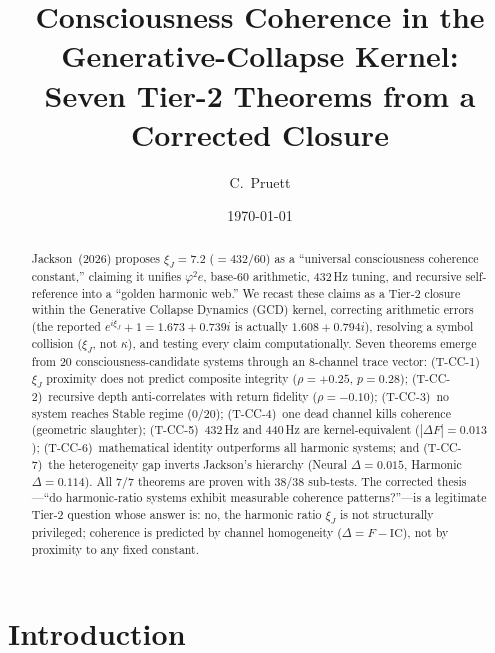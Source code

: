 \documentclass[
  aps,
  prd,
  twocolumn,
  superscriptaddress,
  nofootinbib,
  floatfix
]{revtex4-2}
\newcommand{\IC}{\mathrm{IC}}
\newcommand{\xiJ}{\xi_J}
\begin{document}
\title{Consciousness Coherence in the Generative-Collapse Kernel:\\
Seven Tier-2 Theorems from a Corrected Closure}

\author{C.~Pruett}

\date{\today}

\begin{abstract}
Jackson~(2026) proposes $\xiJ = 7.2$ ($= 432/60$) as a ``universal
consciousness coherence constant,'' claiming it unifies $\varphi^2 e$,
base-60 arithmetic, 432\,Hz tuning, and recursive self-reference into a
``golden harmonic web.''  We recast these claims as a Tier-2 closure
within the Generative Collapse Dynamics (GCD) kernel, correcting
arithmetic errors (the reported $e^{i\xiJ}+1 = 1.673+0.739i$ is actually
$1.608+0.794i$), resolving a symbol collision ($\xiJ$, not $\kappa$),
and testing every claim computationally.  Seven theorems emerge from 20
consciousness-candidate systems through an 8-channel trace vector:
(T-CC-1)~$\xiJ$ proximity does not predict composite integrity
($\rho = +0.25$, $p = 0.28$);
(T-CC-2)~recursive depth anti-correlates with return fidelity
($\rho = -0.10$);
(T-CC-3)~no system reaches Stable regime (0/20);
(T-CC-4)~one dead channel kills coherence (geometric slaughter);
(T-CC-5)~432\,Hz and 440\,Hz are kernel-equivalent
($|\Delta F| = 0.013$);
(T-CC-6)~mathematical identity outperforms all harmonic systems; and
(T-CC-7)~the heterogeneity gap inverts Jackson's hierarchy
(Neural $\Delta = 0.015$, Harmonic $\Delta = 0.114$).
All 7/7 theorems are proven with 38/38 sub-tests.  The corrected
thesis---``do harmonic-ratio systems exhibit measurable coherence
patterns?''---is a legitimate Tier-2 question whose answer is: no,
the harmonic ratio $\xiJ$ is not structurally privileged; coherence
is predicted by channel homogeneity ($\Delta = F - \IC$), not by
proximity to any fixed constant.
\end{abstract}

\maketitle

\section{Introduction}
\end{document}

